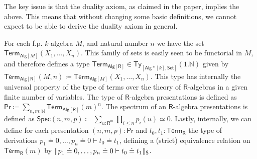 \documentclass[10pt,a4paper]{article}
\theoremstyle{definition}
\theoremstyle{remark}
\newcommand{\nats}{\mathbb{N}}
\newcommand{\Set}{\mathsf{Set}}
\newcommand{\Alg}{\mathsf{Alg}}
\newcommand\Ty{\mathsf{Ty}}
\newcommand\R{\mathsf{R}}
\newcommand\Spec{\mathsf{Spec}}
\renewcommand\Pr{\mathsf{Pr}}
\newcommand\Term{\mathsf{Term}}
\begin{document}
The key issue is that the duality axiom, as claimed in the paper, implies the above.
This means that without changing some basic definitions, we cannot expect to be able to derive the duality axiom in general.

For each f.p. \(k\)-algebra \(M\), and natural number \(n\) we have the set \(\Term_{\Alg[M]}(X_1, \ldots, X_n)\).
This family of sets is easily seen to be functorial in \(M\), and therefore defines a type \(\Term_{\Alg[\R]} \in \Ty_{[\Alg*[k], \Set]}(1.\nats)\) given by \(\Term_{\Alg[\R]}(M, n) \coloneqq \Term_{\Alg[M]}(X_1, \ldots, X_n)\).
This type has internally the universal property of the type of terms over the theory of \(\R\)-algebras in a given finite number of variables.
The type of \(\R\)-algebra presentations is defined as \(\Pr \coloneqq \sum_{n, m \colon \nats} \Term_{\Alg[\R]}(m)^n\). 
The spectrum of an \(\R\)-algebra presentations is defined as \(\Spec(n, m, p) \coloneqq \sum_{ u \colon \R^{m} } \prod_{i \leq n} p_i(u) \simeq 0\).
Lastly, internally, we can define for each presentation \((n, m, p) \colon \Pr\) and \(t_0, t_1 \colon \Term_{\R}\) the type of derivations \(p_1 \doteq 0, \ldots, p_n \doteq 0 \vdash t_0 \doteq t_1\), defining a (strict) equivalence relation on \(\Term_{\R}(m)\) by \(\trunc*{p_1 \doteq 0, \ldots, p_n \doteq 0 \vdash t_0 \doteq t_1}\).
\end{document}
